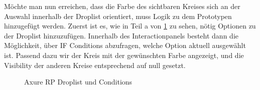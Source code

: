 Möchte man nun erreichen, dass die Farbe des sichtbaren Kreises sich an der Auswahl innerhalb der Droplist orientiert, muss Logik zu dem Prototypen hinzugefügt werden.
Zuerst ist es, wie in Teil a von \cref{fig:Droplist} zu sehen, nötig Optionen zu der Droplist hinzuzufügen.
Innerhalb des Interactionpanels besteht dann die Möglichkeit, über IF Conditions abzufragen, welche Option aktuell ausgewählt ist.
Passend dazu wir der Kreis mit der gewünschten Farbe angezeigt, und die Visibility der anderen Kreise entsprechend auf null gesetzt.

\begin{figure}%
\centering
{}%
\qquad
{}%

\caption{Axure RP Droplist und Conditions}%
\label{fig:Droplist}
\end{figure}

